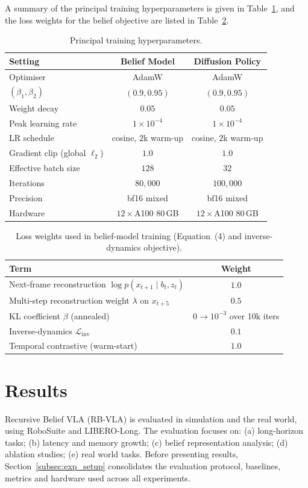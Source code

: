 \documentclass[12pt]{article}
\begin{document}
A summary of the principal training hyperparameters is given in Table~\ref{tab:hparams}, and the loss weights for the belief objective are listed in Table~\ref{tab:loss_weights}.

\begin{table}[h]
\centering
\caption{Principal training hyperparameters.}
\label{tab:hparams}
\begin{tabular}{lcc}
\toprule
\textbf{Setting} & \textbf{Belief Model} & \textbf{Diffusion Policy} \\
\midrule
Optimiser & AdamW & AdamW \\
$(\beta_1, \beta_2)$ & $(0.9, 0.95)$ & $(0.9, 0.95)$ \\
Weight decay & $0.05$ & $0.05$ \\
Peak learning rate & $1\times 10^{-4}$ & $1\times 10^{-4}$ \\
LR schedule & cosine, $2$k warm-up & cosine, $2$k warm-up \\
Gradient clip (global $\ell_2$) & $1.0$ & $1.0$ \\
Effective batch size & $128$ & $32$ \\
Iterations & $80{,}000$ & $100{,}000$ \\
Precision & bf16 mixed & bf16 mixed \\
Hardware & $12\times$A100 80\,GB & $12\times$A100 80\,GB \\
\bottomrule
\end{tabular}
\end{table}

\begin{table}[h]
\centering
\caption{Loss weights used in belief-model training (Equation~(4) and inverse-dynamics objective).}
\label{tab:loss_weights}
\begin{tabular}{lc}
\toprule
\textbf{Term} & \textbf{Weight} \\
\midrule
Next-frame reconstruction $\log p(x_{t+1} \mid b_t, z_t)$ & $1.0$ \\
Multi-step reconstruction weight $\lambda$ on $x_{t+5}$ & $0.5$ \\
KL coefficient $\beta$ (annealed) & $0 \rightarrow 10^{-3}$ over 10k iters \\
Inverse-dynamics $\mathcal{L}_{\text{inv}}$ & $0.1$ \\
Temporal contrastive (warm-start) & $1.0$ \\
\bottomrule
\end{tabular}
\end{table}

\section{Results}
Recursive Belief VLA (RB-VLA) is evaluated in simulation and the real world, using RoboSuite and LIBERO-Long. The evaluation focuses on: (a) long-horizon tasks; (b) latency and memory growth; (c) belief representation analysis; (d) ablation studies; (e) real world tasks. Before presenting results, Section~\ref{subsec:exp_setup} consolidates the evaluation protocol, baselines, metrics and hardware used across all experiments.
\end{document}
